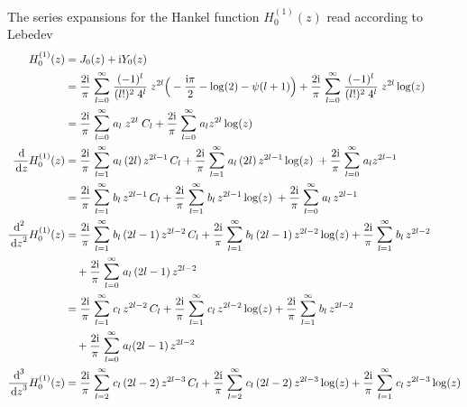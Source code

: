 The series expansions for the Hankel function $H_0^{(1)}(z)$ read according to Lebedev  \cite{lebedev}
\begin{align*}
  H_0^{(1)}(z)
  &= J_0(z) + \ii Y_0(z) \\
  &= \frac{2 \ii}{\pi} \; \mathlarger{\sum}_{l = 0}^\infty \; \frac{(-1)^l}{(l!)^2 \; 4^l} \;  z^{2l} \Big( -\frac{\ii \pi}{2} - \log(2) - \psi(l + 1) \Big) + \frac{2 \ii}{\pi} \; \mathlarger{\sum}_{l = 0}^\infty \; \frac{(-1)^l}{(l!)^2 \; 4^l} \;  z^{2l} \log(z) \\
  &= \frac{2 \ii}{\pi} \; \mathlarger{\sum}_{l = 0}^\infty \; a_l \;  z^{2l} \; C_l + \frac{2 \ii}{\pi} \; \mathlarger{\sum}_{l = 0}^\infty \; a_l z^{2l} \log(z) \\
  \frac{\d{}}{\d z} H_0^{(1)}(z)
  &= \frac{2 \ii}{\pi} \; \mathlarger{\sum}_{l = 1}^\infty \; a_l \,  (2l) \, z^{2l - 1} \, C_l + \frac{2 \ii}{\pi}  \; \mathlarger{\sum}_{l = 1}^\infty \; a_l \, (2l)  \, z^{2l - 1} \log(z) \; + \frac{2 \ii}{\pi}\; \mathlarger{\sum}_{l = 0}^\infty \; a_l z^{2l - 1} \\
  &= \frac{2 \ii}{\pi} \; \mathlarger{\sum}_{l = 1}^\infty \; b_l \, z^{2l - 1} \, C_l + \frac{2 \ii}{\pi}  \; \mathlarger{\sum}_{l = 1}^\infty \; b_l \, z^{2l - 1} \log(z) \; + \frac{2 \ii}{\pi}\; \mathlarger{\sum}_{l = 0}^\infty \; a_l \, z^{2l - 1} \\
  \frac{\d{}^2}{\d z^2} H_0^{(1)}(z)
  &= \frac{2 \ii}{\pi} \; \mathlarger{\sum}_{l = 1}^\infty \; b_l \, (2l - 1) \, z^{2l - 2} \, C_l + \frac{2 \ii}{\pi}  \; \mathlarger{\sum}_{l = 1}^\infty \; b_l \, (2l - 1)\, z^{2l - 2} \log(z) + \frac{2 \ii}{\pi} \; \mathlarger{\sum}_{l = 1}^\infty \; b_l \, z^{2l - 2} \\
  &\quad + \frac{2 \ii}{\pi}\; \mathlarger{\sum}_{l = 0}^\infty \; a_l \, (2l - 1) \, z^{2l - 2} \\
  &= \frac{2 \ii}{\pi} \; \mathlarger{\sum}_{l = 1}^\infty \; c_l \, z^{2l - 2} \, C_l + \frac{2 \ii}{\pi}  \; \mathlarger{\sum}_{l = 1}^\infty \; c_l \, z^{2l - 2} \log(z) + \frac{2 \ii}{\pi} \; \mathlarger{\sum}_{l = 1}^\infty \; b_l \, z^{2l - 2} \\
  &\quad + \frac{2 \ii}{\pi}\; \mathlarger{\sum}_{l = 0}^\infty \; a_l (2l - 1) \, z^{2l - 2} \\
  \frac{\d{}^3}{\d z^3} H_0^{(1)}(z)
  &= \frac{2 \ii}{\pi} \; \mathlarger{\sum}_{l = 2}^\infty \; c_l \, (2l - 2) \, z^{2l - 3} \, C_l + \frac{2 \ii}{\pi} \; \mathlarger{\sum}_{l = 2}^\infty \; c_l \, (2l - 2) \, z^{2l - 3} \log(z) + \frac{2 \ii}{\pi} \; \mathlarger{\sum}_{l = 1}^\infty \; c_l \, z^{2l - 3} \log(z) \\

\end{align*}
